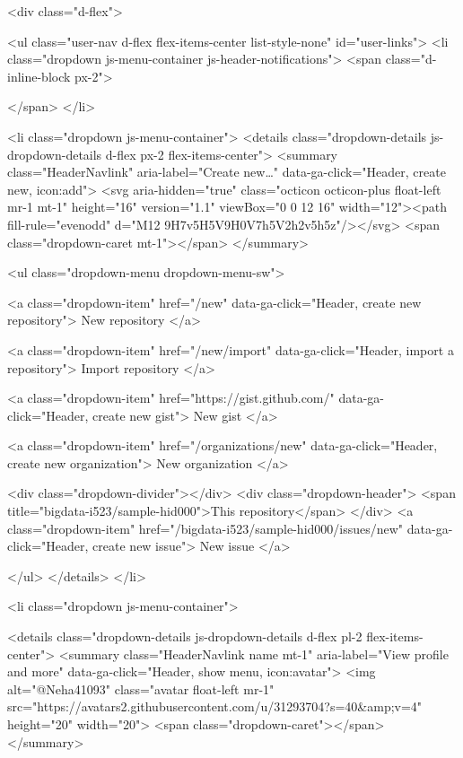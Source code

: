       <div class="d-flex">
        
<ul class="user-nav d-flex flex-items-center list-style-none" id="user-links">
  <li class="dropdown js-menu-container js-header-notifications">
    <span class="d-inline-block  px-2">
      

    </span>
  </li>

  <li class="dropdown js-menu-container">
    <details class="dropdown-details js-dropdown-details d-flex px-2 flex-items-center">
      <summary class="HeaderNavlink"
         aria-label="Create new…"
         data-ga-click="Header, create new, icon:add">
        <svg aria-hidden="true" class="octicon octicon-plus float-left mr-1 mt-1" height="16" version="1.1" viewBox="0 0 12 16" width="12"><path fill-rule="evenodd" d="M12 9H7v5H5V9H0V7h5V2h2v5h5z"/></svg>
        <span class="dropdown-caret mt-1"></span>
      </summary>

      <ul class="dropdown-menu dropdown-menu-sw">
        
<a class="dropdown-item" href="/new" data-ga-click="Header, create new repository">
  New repository
</a>

  <a class="dropdown-item" href="/new/import" data-ga-click="Header, import a repository">
    Import repository
  </a>

<a class="dropdown-item" href="https://gist.github.com/" data-ga-click="Header, create new gist">
  New gist
</a>

  <a class="dropdown-item" href="/organizations/new" data-ga-click="Header, create new organization">
    New organization
  </a>



  <div class="dropdown-divider"></div>
  <div class="dropdown-header">
    <span title="bigdata-i523/sample-hid000">This repository</span>
  </div>
    <a class="dropdown-item" href="/bigdata-i523/sample-hid000/issues/new" data-ga-click="Header, create new issue">
      New issue
    </a>

      </ul>
    </details>
  </li>

  <li class="dropdown js-menu-container">

    <details class="dropdown-details js-dropdown-details d-flex pl-2 flex-items-center">
      <summary class="HeaderNavlink name mt-1"
        aria-label="View profile and more"
        data-ga-click="Header, show menu, icon:avatar">
        <img alt="@Neha41093" class="avatar float-left mr-1" src="https://avatars2.githubusercontent.com/u/31293704?s=40&amp;v=4" height="20" width="20">
        <span class="dropdown-caret"></span>
      </summary>

